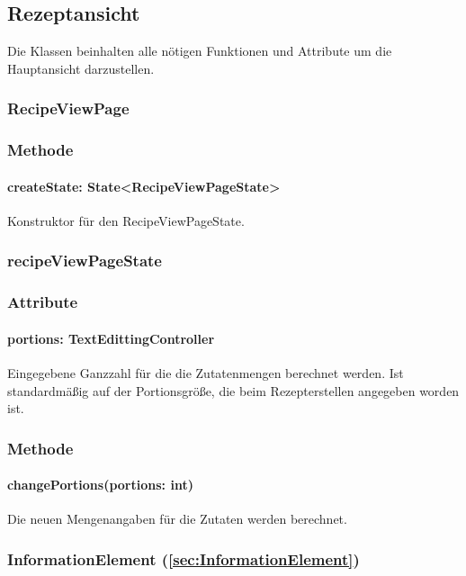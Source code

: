\documentclass[parskip=full]{scrartcl}
\begin{document}
\subsection{Rezeptansicht}
    Die Klassen beinhalten alle nötigen Funktionen und Attribute um die Hauptansicht darzustellen.

    \subsubsection{RecipeViewPage}
        \subsubsection*{Methode}
            \paragraph*{createState: State<RecipeViewPageState>} Konstruktor für den RecipeViewPageState.
        
    \subsubsection{recipeViewPageState}
        \subsubsection*{Attribute}
            \paragraph*{portions: TextEdittingController} Eingegebene Ganzzahl für die die Zutatenmengen berechnet werden. Ist standardmäßig auf der Portionsgröße, die beim Rezepterstellen angegeben worden ist.
    
        \subsubsection*{Methode}
            \paragraph*{changePortions(portions: int)} Die neuen Mengenangaben für die Zutaten werden berechnet.

    \subsubsection*{InformationElement (\ref{sec:InformationElement})}
\end{document}
